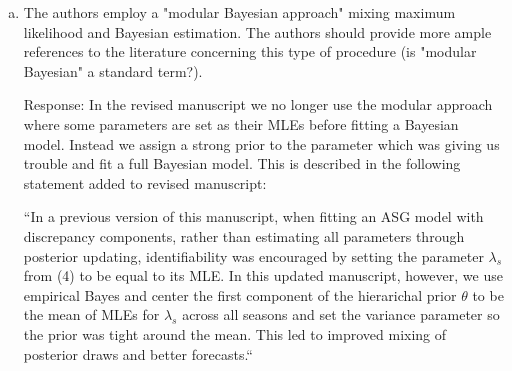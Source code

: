 \documentclass{article}
\newcommand{\spencer}[1]{{\color{red} Response: #1}}
\begin{document}
\begin{enumerate}[1.]
\begin{enumerate}[a.]
% 

\item The authors employ a "modular Bayesian approach" mixing maximum likelihood and
Bayesian estimation. The authors should provide more ample references to the literature concerning
this type of procedure (is "modular Bayesian" a standard term?).

\spencer{In the revised manuscript we no longer use the modular approach
where some parameters are set as their MLEs before fitting a Bayesian 
model. Instead
we assign a strong prior to the parameter which was giving us trouble
and fit a full Bayesian model. This is
described in the following statement added to revised manuscript:

``In a previous version of this manuscript, when fitting an ASG model
with discrepancy components,
rather than estimating all parameters through posterior updating,
identifiability was encouraged by setting
the parameter $\lambda_s$ from (4)
to be equal to its MLE. In this updated manuscript, 
however, we use empirical Bayes and center the first component of the 
hierarichal prior $\theta$ to be the mean of MLEs for $\lambda_s$ across
all seasons and set the variance parameter so the prior was tight around the
mean. This led to improved mixing of posterior draws and better forecasts.``}


\end{enumerate}
\end{enumerate}
\end{document}
